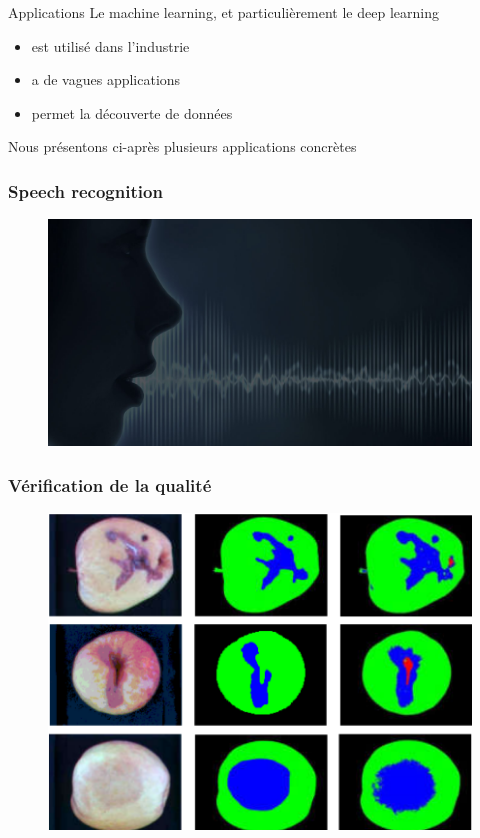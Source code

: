 \documentclass[compress]{beamer}
\begin{document}
\begin{frame}{Applications}
	Le machine learning, et particulièrement le deep learning
	\begin{itemize}
		\item est utilisé dans l'industrie
		\item a de vagues applications
		\item permet la découverte de données
	\end{itemize}

	Nous présentons ci-après plusieurs applications concrètes
\end{frame}

\begin{frame}
	\frametitle{Speech recognition}

	\begin{figure}
		\centering
		\includegraphics[width=1\linewidth]{resources/speech}
	\end{figure}

\end{frame}

\begin{frame}
	\frametitle{Vérification de la qualité}

	\begin{figure}
		\centering
		\includegraphics[width=0.8\linewidth]{resources/quality}
	\end{figure}

\end{frame}
\end{document}
